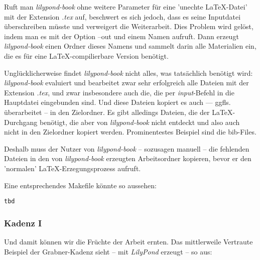 Ruft man \emph{lilypond-book} ohne weitere Parameter für eine 'unechte
\LaTeX-Datei' mit der Extension \emph{.tex} auf, beschwert es sich jedoch, dass
es seine Inputdatei überschreiben müsste und verweigert die Weiterarbeit. Dies
Problem wird gelöst, indem man es mit der Option --out und einem Namen aufruft.
Dann erzeugt \emph{lilypond-book} einen Ordner dieses Namens und sammelt darin
alle Materialien ein, die es für eine \LaTeX-compilierbare Version benötigt.

Unglücklicherweise findet \emph{lilypond-book} nicht alles, was tatsächlich
benötigt wird: \emph{lilypond-book} evaluiert und bearbeitet zwar sehr
erfolgreich alle Dateien mit der Extension \emph{.tex}, und zwar insbesondere
auch die, die per \emph{input}-Befehl in die Hauptdatei eingebunden sind. Und
diese Dateien kopiert es auch --- ggfls. überarbeitet -- in den Zielordner. Es
gibt alledings Dateien, die der \LaTeX-Durchgang benötigt, die aber von
\emph{lilypond-book} nicht entdeckt und also auch nicht in den Zielordner
kopiert werden. Prominentestes Beispiel sind die bib-Files.

Deshalb muss der Nutzer von \emph{lilypond-book} -- sozusagen manuell -- die
fehlenden Dateien in den von \emph{lilypond-book} erzeugten Arbeitsordner kopieren,
bevor er den 'normalen' \LaTeX-Erzegungsprozess aufruft.

Eine entsprechendes Makefile könnte so aussehen:

\begin{verbatim}
tbd
\end{verbatim}


\subsubsection{Kadenz I}

Und damit können wir die Früchte der Arbeit ernten. Das mittlerweile Vertraute
Beispiel der Grabner-Kadenz sieht -- mit \emph{LilyPond} erzeugt -- so aus:

\begin{center}
\end{center}

